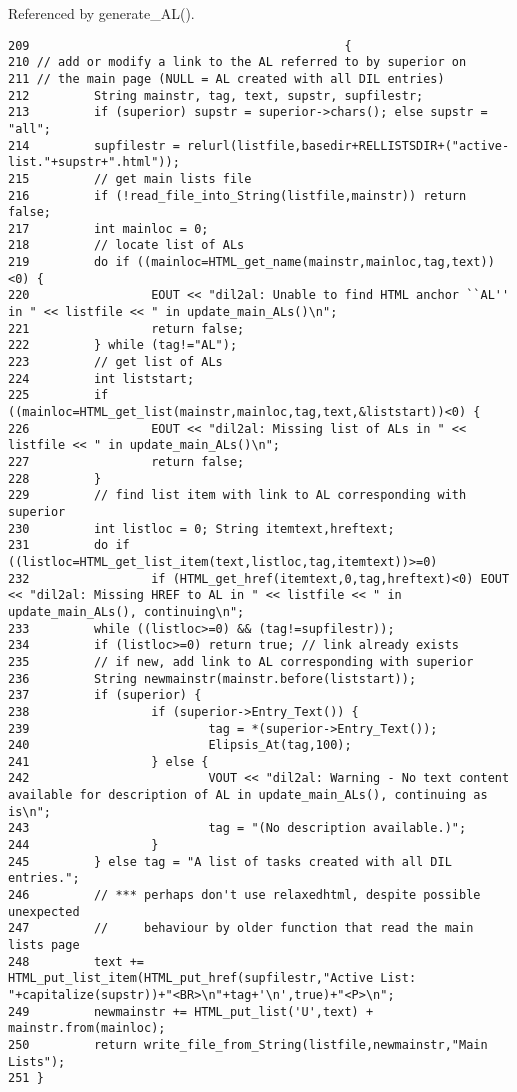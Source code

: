 Referenced by generate\_\-AL().



\footnotesize\begin{verbatim}209                                            {
210 // add or modify a link to the AL referred to by superior on
211 // the main page (NULL = AL created with all DIL entries)
212         String mainstr, tag, text, supstr, supfilestr;
213         if (superior) supstr = superior->chars(); else supstr = "all";
214         supfilestr = relurl(listfile,basedir+RELLISTSDIR+("active-list."+supstr+".html"));
215         // get main lists file
216         if (!read_file_into_String(listfile,mainstr)) return false;
217         int mainloc = 0;
218         // locate list of ALs
219         do if ((mainloc=HTML_get_name(mainstr,mainloc,tag,text))<0) {
220                 EOUT << "dil2al: Unable to find HTML anchor ``AL'' in " << listfile << " in update_main_ALs()\n";
221                 return false;
222         } while (tag!="AL");
223         // get list of ALs
224         int liststart;
225         if ((mainloc=HTML_get_list(mainstr,mainloc,tag,text,&liststart))<0) {
226                 EOUT << "dil2al: Missing list of ALs in " << listfile << " in update_main_ALs()\n";
227                 return false;
228         }
229         // find list item with link to AL corresponding with superior
230         int listloc = 0; String itemtext,hreftext;
231         do if ((listloc=HTML_get_list_item(text,listloc,tag,itemtext))>=0) 
232                 if (HTML_get_href(itemtext,0,tag,hreftext)<0) EOUT << "dil2al: Missing HREF to AL in " << listfile << " in update_main_ALs(), continuing\n";
233         while ((listloc>=0) && (tag!=supfilestr));
234         if (listloc>=0) return true; // link already exists
235         // if new, add link to AL corresponding with superior
236         String newmainstr(mainstr.before(liststart));
237         if (superior) {
238                 if (superior->Entry_Text()) {
239                         tag = *(superior->Entry_Text());
240                         Elipsis_At(tag,100);
241                 } else {
242                         VOUT << "dil2al: Warning - No text content available for description of AL in update_main_ALs(), continuing as is\n";
243                         tag = "(No description available.)";
244                 }
245         } else tag = "A list of tasks created with all DIL entries.";
246         // *** perhaps don't use relaxedhtml, despite possible unexpected
247         //     behaviour by older function that read the main lists page
248         text += HTML_put_list_item(HTML_put_href(supfilestr,"Active List: "+capitalize(supstr))+"<BR>\n"+tag+'\n',true)+"<P>\n";
249         newmainstr += HTML_put_list('U',text) + mainstr.from(mainloc);
250         return write_file_from_String(listfile,newmainstr,"Main Lists");
251 }
\end{verbatim}\normalsize 
